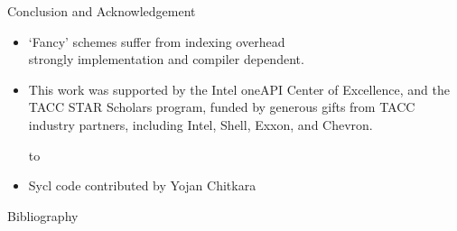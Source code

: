 \documentclass[10pt,t]{beamer}
\begin{document}
\begin{comment}
  \begin{frame}[containsverbatim]{Can we use execution policies?}
    \begin{itemize}
    \item Last time I tried there was a compiler issue
    \item That 5-point stencil is hard to express in range views!
    \end{itemize}
  \end{frame}
\end{comment}

\begin{frame}[containsverbatim]{Conclusion and Acknowledgement}
  \begin{itemize}
  \item `Fancy' schemes suffer from indexing overhead\\
    strongly implementation and compiler dependent.
  \item This work was supported by
    the Intel oneAPI Center of Excellence, and the 
    TACC STAR Scholars program,
    funded by generous gifts from TACC industry partners, including Intel, Shell, Exxon,
    and Chevron.\par
  \hbox to 
  \item Sycl code contributed by Yojan Chitkara
  \end{itemize}
\end{frame}

\begin{frame}{Bibliography}
  
  
\end{frame}
\end{document}
